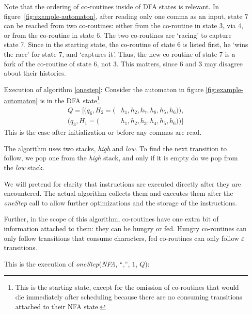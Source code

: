 \documentclass[11pt]{Thesis}
\theoremstyle{definition}
\newcommand{\Figref}[1]{figure~\ref{fig:#1}}
\begin{document}
Note that the ordering of co-routines inside of DFA states is relevant.
In \Figref{example-automaton}, after reading only one comma as an
input, state 7 can be reached from two co-routines: either from the
co-routine in state 3, via 4, or from the co-routine in state 6. The two
co-routines are `racing' to capture state 7. Since in the starting
state, the co-routine of state 6 is listed first, he `wins the race'
for state 7, and `captures it'. Thus, the new co-routine of state 7 is
a fork of the co-routine of state 6, not 3. This matters, since 6 and
3 may disagree about their histories.

\begin{example} Execution of algorithm \ref{onestep}: \label{ex:oneStep1}
Consider the automaton in figure \ref{fig:example-automaton} is in
the DFA state\footnote{This is the starting state, except for the omission of
co-routines that would die immediately after scheduling because there are no
consuming transitions attached to their NFA state.}
\begin{align*}
Q=[
	(q_6, H_2=(&h_1, h_2, h_7,  h_8, h_5, h_6)), \\
	(q_3, H_1=(&h_1, h_2, h_3,  h_4, h_5, h_6))]
	\end{align*}
This is the case after initialization or before any commas are read.

The algorithm uses two stacks, \emph{high} and \emph{low}.
To find the next transition to follow, we pop one from the \emph{high} stack,
and only if it is empty do we pop from the \emph{low} stack.

We will pretend for clarity that instructions are executed directly
after they are encountered.  The actual algorithm collects them and
executes them after the \emph{oneStep} call to allow further
optimizations and the storage of the instructions.

Further, in the scope of this algorithm, co-routines have one extra bit of
information attached to them: they can be hungry or fed. Hungry co-routines can
only follow transitions that consume characters, fed co-routines can only
follow $\varepsilon$ transitions.

This is the execution of \emph{oneStep}(\emph{NFA},
``,'', $1$, $Q$):


\end{example}
\end{document}
